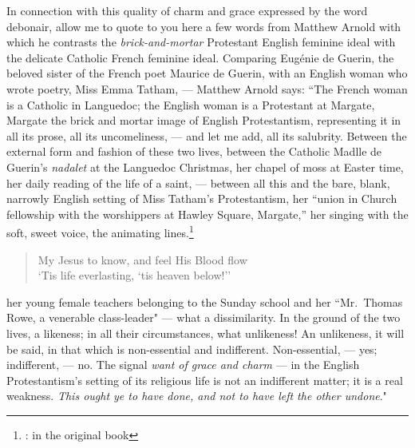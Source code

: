 In connection with this quality of charm and grace expressed by the word debonair, allow me to quote to you here a few words from Matthew Arnold with which he contrasts the \emph{brick-and-mortar}  Protestant English feminine ideal with the delicate Catholic French feminine ideal.
Comparing Eug\'enie de Guerin,  the beloved sister of the French poet Maurice de Guerin, with an English woman who wrote poetry, Miss Emma Tatham,  --- Matthew Arnold says: ``The French woman is a Catholic in Languedoc; the English woman is a Protestant at Margate, Margate the brick and mortar image of English Protestantism, representing it in all its prose, all its uncomeliness, --- and let me add, all its salubrity.
Between the external form and fashion of these two lives, between the Catholic Madlle de Guerin's \emph{nadalet} at the Languedoc Christmas, her chapel of moss at Easter time, her daily reading of the life of a saint, --- between all this and the bare, blank, narrowly English setting of Miss Tatham's Protestantism, her ``union in Church fellowship with the worshippers at Hawley Square, Margate,'' her singing with the soft, sweet voice, the animating lines.\footnote{: in the original book}
\begin{quote}\footnotesize
   My Jesus to know, and feel His Blood flow\\
   `Tis life everlasting, `tis heaven below!''\\
\end{quote}
her young female teachers belonging to the Sunday school and her ``Mr.~Tho\-mas Rowe, a venerable class-leader" --- what a dissimilarity.
In the ground of the two lives, a likeness; in all their circumstances, what unlikeness!
An unlikeness, it will be said, in that which is non-essential and indifferent.
Non-essential, --- yes; indifferent, --- no.
The signal \emph{want of grace and charm} --- in the English Protestantism's setting of its religious life is not an indifferent matter; it is a real weakness.
\emph{This ought ye to have done, and not to have left the other undone}."


